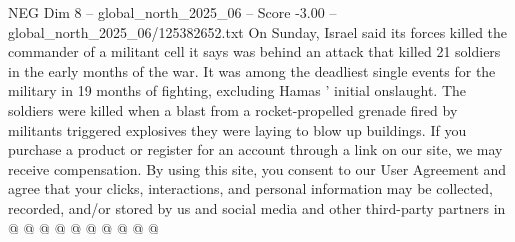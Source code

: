 \begin{textsample}{NEG Dim 8 – global\_north\_2025\_06 – Score -3.00 – global\_north\_2025\_06/125382652.txt}
On Sunday, Israel said its forces killed the commander of a militant cell it says was behind an attack that killed 21 soldiers in the early months of the war.
It was among the deadliest single events for the military in 19 months of fighting, excluding Hamas ' initial onslaught.
The soldiers were killed when a blast from a rocket-propelled grenade fired by militants triggered explosives they were laying to blow up buildings.
If you purchase a product or register for an account through a link on our site, we may receive compensation.
By using this site, you consent to our User Agreement and agree that your clicks, interactions, and personal information may be collected, recorded, and/or stored by us and social media and other third-party partners in @ @ @ @ @ @ @ @ @ @

\end{textsample}
